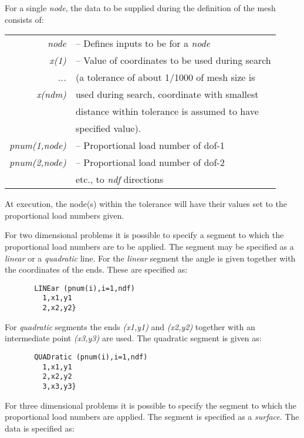 For a single {\it node}, the data to be supplied during
the definition of the mesh consists of:

\begin{center}
\begin{tabular}{r l}
\it node   &-- Defines inputs to be for a {\it node} \\
\it x(1)   &-- Value of coordinates to be used during search \\
\it ...    &\quad (a tolerance of about 1/1000 of mesh size is \\
\it x(ndm) &\quad used during search, coordinate with smallest \\
           &\quad distance within tolerance is assumed to have \\
           &\quad specified value). \\
\it pnum(1,node) &-- Proportional load number of dof-1 \\
\it pnum(2,node) &-- Proportional load number of dof-2 \\
                 &\quad etc., to {\it ndf} directions \\
\end{tabular}
\end{center}
At execution, the node(s) within the tolerance will have
their values set to the proportional load numbers given.

For two dimensional problems it is possible to
specify a segment to which the proportional load numbers are to be
applied.  The segment may be specified as a {\it linear}
or a {\it quadratic} line. For the {\it linear} segment the angle
is given together with the coordinates of the ends.
These are specified as:

\begin{verbatim}
       LINEar (pnum(i),i=1,ndf)
         1,x1,y1
         2,x2,y2}
\end{verbatim}

For {\it quadratic} segments the ends {\it (x1,y1)} and {\it (x2,y2)}
together with an intermediate point {\it (x3,y3)} are used.
The quadratic segment is given as:

\begin{verbatim}
       QUADratic (pnum(i),i=1,ndf)
         1,x1,y1
         2,x2,y2
         3,x3,y3}
\end{verbatim}

For three dimensional problems it is possible to
specify the segment to which the proportional load numbers
are applied.  The segment is specified as a {\it surface}.
The data is specified as:

